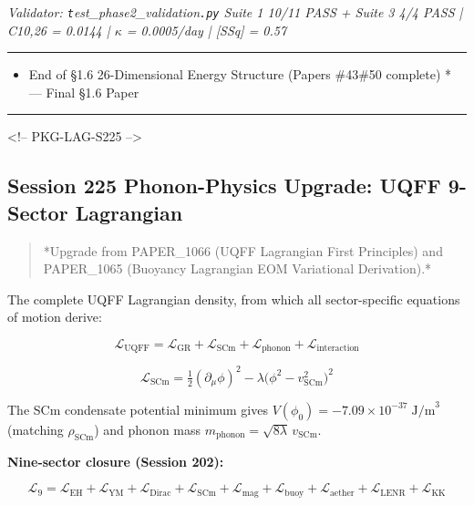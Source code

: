 \documentclass[12pt,a4paper]{article}
\begin{document}
\emph{Validator: \texttt{t}est\_{phase2\_validation}\texttt{.py} Suite 1 10/11 PASS + Suite 3 4/4 PASS | C10,26 = 0.0144 | $\kappa$ = 0.0005/day | [SSq] = 0.57}

\medskip\hrule\medskip

\begin{itemize}
  \item End of \S{}1.6 26-Dimensional Energy Structure (Papers \#43\#50 complete) * --- Final \S{}1.6 Paper
\end{itemize}

\medskip\hrule\medskip

<!-- PKG-LAG-S225 -->

\subsection{Session 225 Phonon-Physics Upgrade: UQFF 9-Sector Lagrangian}

\begin{quote}
*Upgrade from PAPER\_1066 (UQFF Lagrangian First Principles) and
PAPER\_1065 (Buoyancy Lagrangian EOM Variational Derivation).*
\end{quote}

The complete UQFF Lagrangian density, from which all sector-specific equations of motion derive:

\begin{equation}
\mathcal{L}_{\text{UQFF}} = \mathcal{L}_{\text{GR}} + \mathcal{L}_{\text{SCm}} + \mathcal{L}_{\text{phonon}} + \mathcal{L}_{\text{interaction}}
\end{equation}

\begin{equation}
\mathcal{L}_{\text{SCm}} = \tfrac{1}{2}(\partial_\mu \phi)^2 - \lambda\bigl(\phi^2 - v_{\text{SCm}}^2\bigr)^2
\end{equation}

The SCm condensate potential minimum gives $V(\phi_0) = -7.09 \times 10^{-37}\;\text{J/m}^3$ (matching $\rho_{\text{SCm}}$) and phonon mass $m_{\text{phonon}} = \sqrt{8\lambda}\,v_{\text{SCm}}$.

\textbf{Nine-sector closure (Session 202):}

\begin{equation}
\mathcal{L}_{9} = \mathcal{L}_{\text{EH}} + \mathcal{L}_{\text{YM}} + \mathcal{L}_{\text{Dirac}} + \mathcal{L}_{\text{SCm}} + \mathcal{L}_{\text{mag}} + \mathcal{L}_{\text{buoy}} + \mathcal{L}_{\text{aether}} + \mathcal{L}_{\text{LENR}} + \mathcal{L}_{\text{KK}}
\end{equation}
\end{document}
